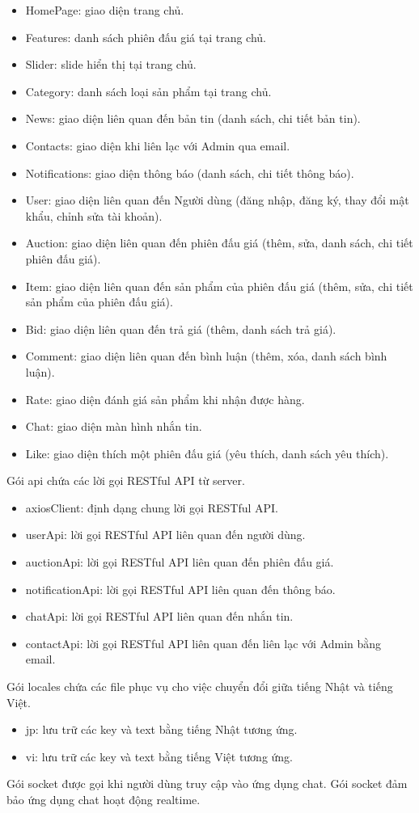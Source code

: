 \documentclass[../DoAn.tex]{subfiles}
\begin{document}
\begin{itemize}
    \item HomePage: giao diện trang chủ.
    \item Features: danh sách phiên đấu giá tại trang chủ.
    \item Slider: slide hiển thị tại trang chủ.
    \item Category: danh sách loại sản phẩm tại trang chủ.
    \item News: giao diện liên quan đến bản tin (danh sách, chi tiết bản tin).
    \item Contacts: giao diện khi liên lạc với Admin qua email.
    \item Notifications: giao diện thông báo (danh sách, chi tiết thông báo).
    \item User: giao diện liên quan đến Người dùng (đăng nhập, đăng ký, thay đổi mật khẩu, chỉnh sửa tài khoản).
    \item Auction: giao diện liên quan đến phiên đấu giá (thêm, sửa, danh sách, chi tiết phiên đấu giá).
    \item Item: giao diện liên quan đến sản phẩm của phiên đấu giá (thêm, sửa, chi tiết sản phẩm của phiên đấu giá).
    \item Bid: giao diện liên quan đến trả giá (thêm, danh sách trả giá).
    \item Comment: giao diện liên quan đến bình luận (thêm, xóa, danh sách bình luận).
    \item Rate: giao diện đánh giá sản phẩm khi nhận được hàng.
    \item Chat: giao diện màn hình nhắn tin.
    \item Like: giao diện thích một phiên đấu giá (yêu thích, danh sách yêu thích).
\end{itemize}
Gói api chứa các lời gọi RESTful API từ server.
\begin{itemize}
    \item axiosClient: định dạng chung lời gọi RESTful API.
    \item userApi: lời gọi RESTful API liên quan đến người dùng.
    \item auctionApi: lời gọi RESTful API liên quan đến phiên đấu giá.
    \item notificationApi: lời gọi RESTful API liên quan đến thông báo.
    \item chatApi: lời gọi RESTful API liên quan đến nhắn tin.
    \item contactApi: lời gọi RESTful API liên quan đến liên lạc với Admin bằng email.
\end{itemize}
Gói locales chứa các file phục vụ cho việc chuyển đổi giữa tiếng Nhật và tiếng Việt.
\begin{itemize}
    \item jp: lưu trữ các key và text bằng tiếng Nhật tương ứng.
    \item vi: lưu trữ các key và text bằng tiếng Việt tương ứng.
\end{itemize}
Gói socket được gọi khi người dùng truy cập vào ứng dụng chat. Gói socket đảm bảo ứng dụng chat hoạt động realtime.
\end{document}
